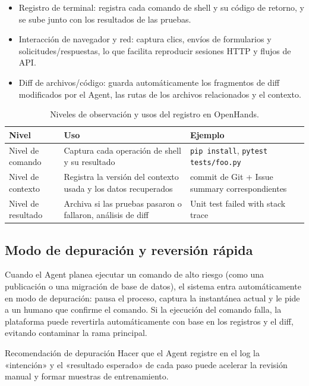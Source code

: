 \documentclass[a4paper]{article}
\begin{document}
\begin{itemize}
    \item Registro de terminal: registra cada comando de shell y su código de retorno, y se sube junto con los resultados de las pruebas.
    \item Interacción de navegador y red: captura clics, envíos de formularios y solicitudes/respuestas, lo que facilita reproducir sesiones HTTP y flujos de API.
    \item Diff de archivos/código: guarda automáticamente los fragmentos de diff modificados por el Agent, las rutas de los archivos relacionados y el contexto.
\end{itemize}

\begin{table}[H]
\centering
\begin{tabular}{p{} p{} p{}}
\toprule
Nivel & Uso & Ejemplo \\
\midrule
Nivel de comando & Captura cada operación de shell y su resultado & \texttt{pip install}, \texttt{pytest tests/foo.py} \\
\midrule
Nivel de contexto & Registra la versión del contexto usada y los datos recuperados & commit de Git + Issue summary correspondientes \\
\midrule
Nivel de resultado & Archiva si las pruebas pasaron o fallaron, análisis de diff & Unit test failed with stack trace \\
\bottomrule
\end{tabular}
\caption{Niveles de observación y usos del registro en OpenHands.}
\end{table}

\subsection{Modo de depuración y reversión rápida}
Cuando el Agent planea ejecutar un comando de alto riesgo (como una publicación o una migración de base de datos), el sistema entra automáticamente en modo de depuración: pausa el proceso, captura la instantánea actual y le pide a un humano que confirme el comando. Si la ejecución del comando falla, la plataforma puede revertirla automáticamente con base en los registros y el diff, evitando contaminar la rama principal.

\begin{knowledgebox}{Recomendación de depuración}
Hacer que el Agent registre en el log la «intención» y el «resultado esperado» de cada paso puede acelerar la revisión manual y formar muestras de entrenamiento.
\end{knowledgebox}
\end{document}
